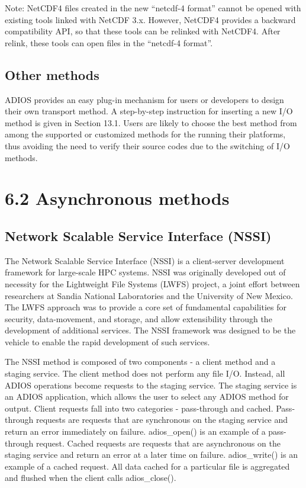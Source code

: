Note: NetCDF4 files created in the new ``netcdf-4 format'' cannot be opened with 
existing tools linked with NetCDF 3.x.  However, NetCDF4 provides a backward compatibility 
API, so that these tools can be relinked with NetCDF4.  After relink, these tools 
can open files in the ``netcdf-4 format''.\label{HToc182553388}

\subsection{Other methods}

ADIOS provides an easy plug-in mechanism for users or developers to design their 
own transport method. A step-by-step instruction for inserting a new I/O method 
is given in Section 13.1. Users are likely to choose the best method from among 
the supported or customized methods for the running their platforms, thus avoiding 
the need to verify their source codes due to the switching of I/O methods.\label{HToc182553389}

\section*{{\large 6.2 }{\large \textbf{Asynchronous methods\label{HToc182553390}}}}

\subsection{Network Scalable Service Interface (NSSI)}

The Network Scalable Service Interface (NSSI) is a client-server development framework 
for large-scale HPC systems.  NSSI was originally developed out of necessity for 
the Lightweight File Systems (LWFS) project, a joint effort between researchers 
at Sandia National Laboratories and the University of New Mexico.  The LWFS approach 
was to provide a core set of fundamental capabilities for security, data-movement, 
and storage, and allow extensibility through the development of additional services. 
 The NSSI framework was designed to be the vehicle to enable the rapid development 
of such services.

The NSSI method is composed of two components - a client method and a staging service. 
 The client method does not perform any file I/O.  Instead, all ADIOS operations 
become requests to the staging service.  The staging service is an ADIOS application, 
which allows the user to select any ADIOS method for output.  Client requests fall 
into two categories - pass-through and cached.  Pass-through requests are requests 
that are synchronous on the staging service and return an error immediately on 
failure.  adios\_open() is an example of a pass-through request.  Cached requests 
are requests that are asynchronous on the staging service and return an error at 
a later time on failure.  adios\_write() is an example of a cached request.  All 
data cached for a particular file is aggregated and flushed when the client calls 
adios\_close().

